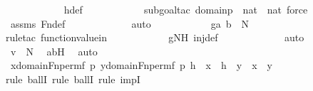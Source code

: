 \begin{isabellebody}
\ \ \ \ \ \ \ \ \ \ \isamarkupfalse%
\ h{\isacharunderscore}{\kern0pt}def\ \isanewline
\ \ \ \ \ \ \ \ \ \ \isamarkupfalse%
{\isacharparenleft}{\kern0pt}subgoal{\isacharunderscore}{\kern0pt}tac\ {\isachardoublequoteopen}domain{\isacharparenleft}{\kern0pt}p{\isacharparenright}{\kern0pt}\ {\isasymsubseteq}\ nat\ {\isasymtimes}\ nat{\isachardoublequoteclose}{\isacharcomma}{\kern0pt}\ force{\isacharparenright}{\kern0pt}\isanewline
\ \ \ \ \ \ \ \ \ \ \isamarkupfalse%
\ assms\ Fn{\isacharunderscore}{\kern0pt}def\ \isanewline
\ \ \ \ \ \ \ \ \ \ \isamarkupfalse%
\ auto\isanewline
\ \ \ \ \ \ \ \ \isamarkupfalse%
\ \isamarkupfalse%
\ {\isachardoublequoteopen}g{\isacharbackquote}{\kern0pt}{\isacharless}{\kern0pt}a{\isacharcomma}{\kern0pt}\ b{\isachargreater}{\kern0pt}\ {\isasymin}\ N{\isachardoublequoteclose}\ \isanewline
\ \ \ \ \ \ \ \ \ \ \isamarkupfalse%
{\isacharparenleft}{\kern0pt}rule{\isacharunderscore}{\kern0pt}tac\ function{\isacharunderscore}{\kern0pt}value{\isacharunderscore}{\kern0pt}in{\isacharparenright}{\kern0pt}\isanewline
\ \ \ \ \ \ \ \ \ \ \isamarkupfalse%
\ gNH\ inj{\isacharunderscore}{\kern0pt}def\ \isanewline
\ \ \ \ \ \ \ \ \ \ \isamarkupfalse%
\ auto\isanewline
\ \ \ \ \ \ \ \ \isamarkupfalse%
\ \isamarkupfalse%
\ {\isachardoublequoteopen}v\ {\isasymin}\ N{\isachardoublequoteclose}\ \isamarkupfalse%
\ abH\ \isamarkupfalse%
\ auto\isanewline
\ \ \ \ \ \ \isamarkupfalse%
\isanewline
\ \ \ \ \isamarkupfalse%
\isanewline
\isanewline
\ \ \ \ \isamarkupfalse%
\ {\isachardoublequoteopen}{\isasymforall}x{\isasymin}domain{\isacharparenleft}{\kern0pt}Fn{\isacharunderscore}{\kern0pt}perm{\isacharparenleft}{\kern0pt}f{\isacharcomma}{\kern0pt}\ p{\isacharparenright}{\kern0pt}{\isacharparenright}{\kern0pt}{\isachardot}{\kern0pt}\ {\isasymforall}y{\isasymin}domain{\isacharparenleft}{\kern0pt}Fn{\isacharunderscore}{\kern0pt}perm{\isacharparenleft}{\kern0pt}f{\isacharcomma}{\kern0pt}\ p{\isacharparenright}{\kern0pt}{\isacharparenright}{\kern0pt}{\isachardot}{\kern0pt}\ h\ {\isacharbackquote}{\kern0pt}\ x\ {\isacharequal}{\kern0pt}\ h\ {\isacharbackquote}{\kern0pt}\ y\ {\isasymlongrightarrow}\ x\ {\isacharequal}{\kern0pt}\ y{\isachardoublequoteclose}\isanewline
\ \ \ \ \isamarkupfalse%
{\isacharparenleft}{\kern0pt}rule\ ballI{\isacharcomma}{\kern0pt}\ rule\ ballI{\isacharcomma}{\kern0pt}\ rule\ impI{\isacharparenright}{\kern0pt}\isanewline

\end{isabellebody}
